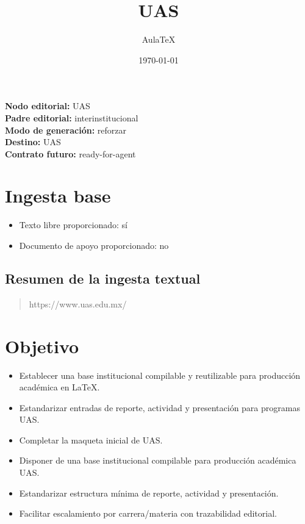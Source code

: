 \documentclass[12pt]{article}
\title{UAS}
\author{AulaTeX}
\date{\today}
\begin{document}
\maketitle

\noindent\textbf{Nodo editorial:} UAS\\
\textbf{Padre editorial:} interinstitucional\\
\textbf{Modo de generación:} reforzar\\
\textbf{Destino:} UAS\\
\textbf{Contrato futuro:} ready-for-agent

\section*{Ingesta base}
\begin{itemize}[leftmargin=*]
  \item Texto libre proporcionado: sí
  \item Documento de apoyo proporcionado: no
\end{itemize}

\subsection*{Resumen de la ingesta textual}
\begin{quote}
https://www.uas.edu.mx/
\end{quote}

\section*{Objetivo}
\begin{itemize}[leftmargin=*]
  \item Establecer una base institucional compilable y reutilizable para producción académica en LaTeX.
  \item Estandarizar entradas de reporte, actividad y presentación para programas UAS.
  \item Completar la maqueta inicial de UAS.
  \item Disponer de una base institucional compilable para producción académica UAS.
  \item Estandarizar estructura mínima de reporte, actividad y presentación.
  \item Facilitar escalamiento por carrera/materia con trazabilidad editorial.
\end{itemize}
\end{document}

